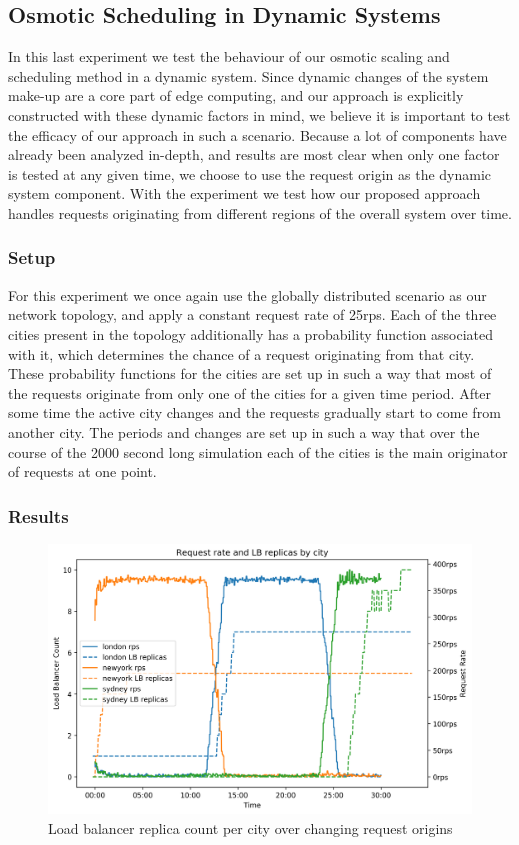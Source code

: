 \subsection{Osmotic Scheduling in Dynamic Systems}
In this last experiment we test the behaviour of our osmotic scaling and scheduling method in a dynamic system.
Since dynamic changes of the system make-up are a core part of edge computing, and our approach is explicitly constructed with these dynamic factors in mind, we believe it is important to test the efficacy of our approach in such a scenario.
Because a lot of components have already been analyzed in-depth, and results are most clear when only one factor is tested at any given time, we choose to use the request origin as the dynamic  system component.
With the experiment we test how our proposed approach handles requests originating from different regions of the overall system over time.
\subsubsection{Setup}
For this experiment we once again use the globally distributed scenario as our network topology, and apply a constant request rate of 25\gls{rps}.
Each of the three cities present in the topology additionally has a probability function associated with it, which determines the chance of a request originating from that city.
These probability functions for the cities are set up in such a way that most of the requests originate from only one of the cities for a given time period.
After some time the active city changes and the requests gradually start to come from another city.
The periods and changes are set up in such a way that over the course of the 2000 second long simulation each of the cities is the main originator of requests at one point.

\subsubsection{Results}

\begin{figure}
    \centering
    \includegraphics[width=14cm]{graphics/graphs/osmotic_dynamic_region_rps_lb_relicas_corrected.png}
    \caption{Load balancer replica count per city over changing request origins}
    \label{fig:osmotic_dynamic_lb_replicas}
\end{figure}

